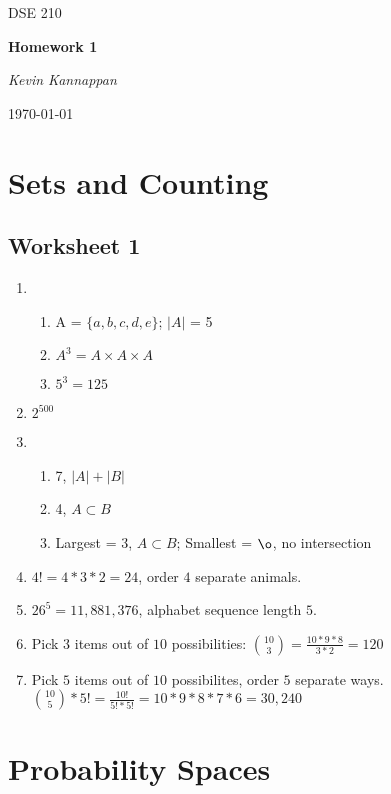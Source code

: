 \documentclass[12pt]{article}
\theoremstyle{plain}
\theoremstyle{definition}
\numberwithin{equation}{theorem}
\begin{document}
\begin{titlepage}
	\centering
	\vspace{4cm}
	{\scshape\Large DSE 210\par}
	\vspace{1.5cm}
	{\huge\bfseries Homework 1\par}
	\vspace{2cm}
	{\Large\itshape Kevin Kannappan\par}

	{\large \today\par}
\end{titlepage}


\section{Sets and Counting}
\subsection{Worksheet 1}
\begin{enumerate}
\item
	\begin{enumerate}
	\item A = $\{a,b,c,d,e\}$; $|A|$ = 5
	\item $A^{3} = A \times A \times A$
	\item $5^{3} = 125$
	\end{enumerate}
\item $2^{500}$
\item
	\begin{enumerate}
	\item 7, $|A| + |B|$
	\item 4, $A \subset B$
	\item Largest = 3, $A \subset B$;  Smallest = $\o$, no intersection
	\end{enumerate}
\item $4! = 4*3*2 = 24$, order $4$ separate animals.
\item $26^{5} = 11,881,376$, alphabet sequence length $5$.
\item Pick $3$ items out of $10$ possibilities: $\binom{10}{3} = \frac{10*9*8}{3*2} = 120$
\item Pick $5$ items out of $10$ possibilites, order $5$ separate ways. $\binom{10}{5}*5! = \frac{10!}{5!*5!} = 10*9*8*7*6=30,240$
\end{enumerate}
\bigskip

\section{Probability Spaces}
\end{document}
